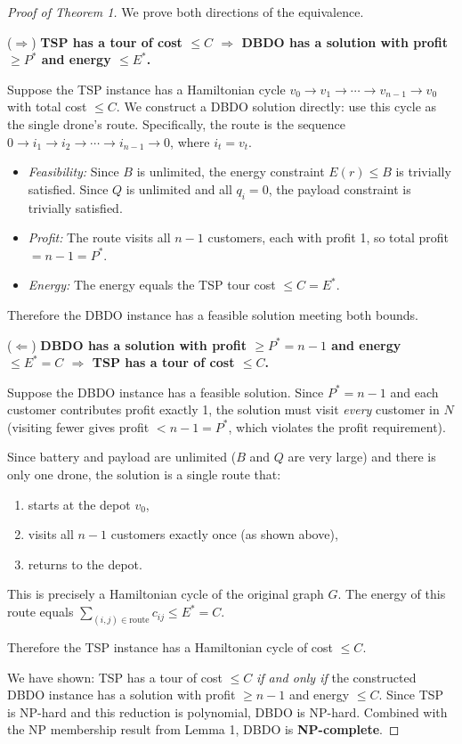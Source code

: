 \documentclass[12pt,a4paper]{article}
\begin{document}
\begin{proof}[Proof of Theorem 1]
We prove both directions of the equivalence.

\medskip
\noindent($\Rightarrow$) \textbf{TSP has a tour of cost $\leq C$ $\Rightarrow$ DBDO
has a solution with profit $\geq P^*$ and energy $\leq E^*$.}

Suppose the TSP instance has a Hamiltonian cycle $v_0 \to v_1 \to \cdots \to v_{n-1}
\to v_0$ with total cost $\leq C$. We construct a DBDO solution directly: use this
cycle as the single drone's route. Specifically, the route is the sequence
$0 \to i_1 \to i_2 \to \cdots \to i_{n-1} \to 0$, where $i_t = v_t$.

\begin{itemize}
  \item \emph{Feasibility:} Since $B$ is unlimited, the energy constraint $E(r) \leq B$
  is trivially satisfied. Since $Q$ is unlimited and all $q_i = 0$, the payload
  constraint is trivially satisfied.
  \item \emph{Profit:} The route visits all $n-1$ customers, each with profit 1, so
  total profit $= n-1 = P^*$. \checkmark
  \item \emph{Energy:} The energy equals the TSP tour cost $\leq C = E^*$. \checkmark
\end{itemize}

Therefore the DBDO instance has a feasible solution meeting both bounds.

\medskip
\noindent($\Leftarrow$) \textbf{DBDO has a solution with profit $\geq P^* = n-1$ and
energy $\leq E^* = C$ $\Rightarrow$ TSP has a tour of cost $\leq C$.}

Suppose the DBDO instance has a feasible solution. Since $P^* = n-1$ and each customer
contributes profit exactly 1, the solution must visit \emph{every} customer in $N$
(visiting fewer gives profit $< n-1 = P^*$, which violates the profit requirement).

Since battery and payload are unlimited ($B$ and $Q$ are very large) and there is only
one drone, the solution is a single route that:
\begin{enumerate}
  \item starts at the depot $v_0$,
  \item visits all $n-1$ customers exactly once (as shown above),
  \item returns to the depot.
\end{enumerate}

This is precisely a Hamiltonian cycle of the original graph $G$. The energy of this
route equals $\sum_{(i,j) \in \text{route}} c_{ij} \leq E^* = C$.

Therefore the TSP instance has a Hamiltonian cycle of cost $\leq C$. \checkmark

\medskip
We have shown: TSP has a tour of cost $\leq C$ \emph{if and only if} the constructed
DBDO instance has a solution with profit $\geq n-1$ and energy $\leq C$. Since TSP is
NP-hard and this reduction is polynomial, DBDO is NP-hard. Combined with the NP
membership result from Lemma 1, DBDO is \textbf{NP-complete}.
\end{proof}
\end{document}
